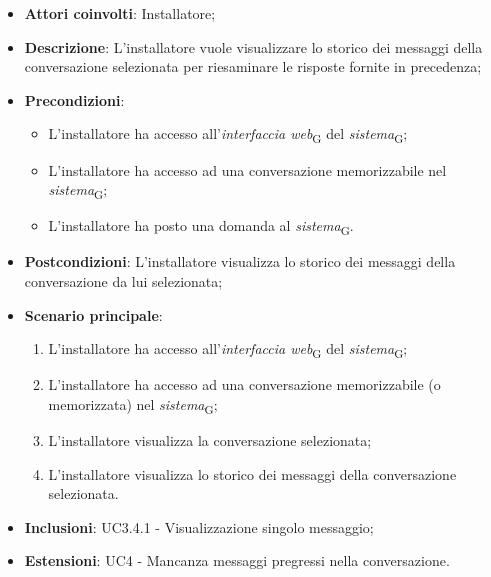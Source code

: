 \begin{itemize}
    \item \textbf{Attori coinvolti}: Installatore;
    \item \textbf{Descrizione}: L'installatore vuole visualizzare lo storico dei messaggi della conversazione selezionata per riesaminare le risposte fornite in precedenza;
    \item \textbf{Precondizioni}: 
    \begin{itemize}
        \item L’installatore ha accesso all’\textit{interfaccia web}\textsubscript{G} del \textit{sistema}\textsubscript{G};
        \item L’installatore ha accesso ad una conversazione memorizzabile nel \textit{sistema}\textsubscript{G};
        \item L'installatore ha posto una domanda al \textit{sistema}\textsubscript{G}.
    \end{itemize}
    \item \textbf{Postcondizioni}: L'installatore visualizza lo storico dei messaggi della conversazione da lui selezionata;
    \item \textbf{Scenario principale}:
    \begin{enumerate}
        \item L’installatore ha accesso all’\textit{interfaccia web}\textsubscript{G} del \textit{sistema}\textsubscript{G};
        \item L’installatore ha accesso ad una conversazione memorizzabile (o memorizzata) nel \textit{sistema}\textsubscript{G};
        \item L'installatore visualizza la conversazione selezionata;
        \item L'installatore visualizza lo storico dei messaggi della conversazione selezionata.
    \end{enumerate}
    \item \textbf{Inclusioni}: UC3.4.1 - Visualizzazione singolo messaggio;
    \item \textbf{Estensioni}: UC4 - Mancanza messaggi pregressi nella conversazione.
\end{itemize}
